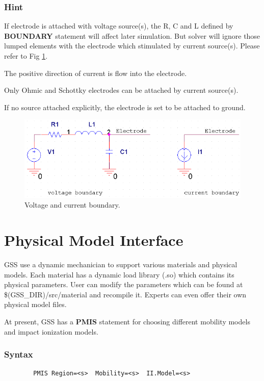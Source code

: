 \documentclass[11pt,pdftex]{article}
\begin{document}
\subsubsection*{Hint}
If electrode is attached with voltage source(s), the R, C and L
defined by \textbf{BOUNDARY} statement will affect later simulation.
But solver will ignore those lumped elements with the electrode
which stimulated by current source(s). Please refer to Fig
\ref{Electrode}.

The positive direction of current is flow into the electrode.

Only Ohmic and Schottky electrodes can be attached by current
source(s).

If no source attached explicitly, the electrode is set to be
attached to ground.

\begin{figure}[ht]
\centering
\includegraphics[scale=0.4]{electrode.png}
\caption{Voltage and current boundary.} \label{Electrode}
\end{figure}


\newpage
\section{Physical Model Interface}
GSS use a dynamic mechanician to support various materials and
physical models. Each material has a dynamic load library (.so)
which contains its physical parameters. User can modify the
parameters which can be found at \$(GSS\_DIR)/src/material and
recompile it. Experts can even offer their own physical model files.

At present, GSS has a \textbf{PMIS} statement for choosing different
mobility models and impact ionization models.

\subsubsection*{Syntax}
\begin{verbatim}
        PMIS Region=<s>  Mobility=<s>  II.Model=<s>
\end{verbatim}
\end{document}
